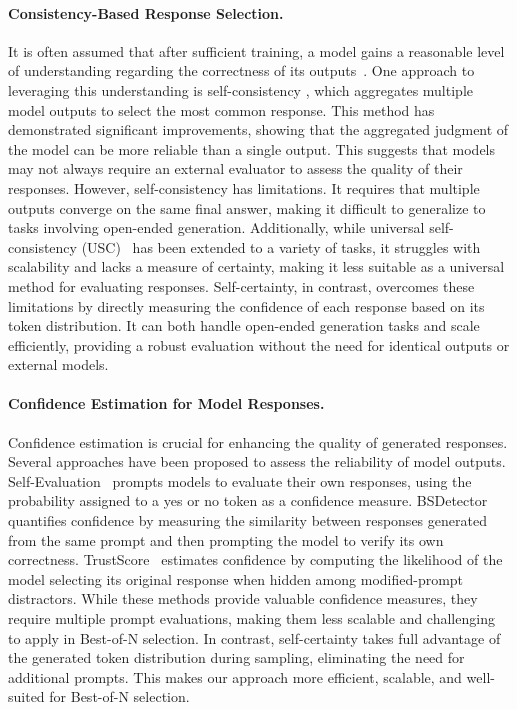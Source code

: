 \paragraph{Consistency-Based Response Selection.}
It is often assumed that after sufficient training, a model gains a reasonable level of understanding regarding the correctness of its outputs~\citep{liang2024internal}. One approach to leveraging this understanding is self-consistency \cite{wang2022self}, which aggregates multiple model outputs to select the most common response. This method has demonstrated significant improvements, showing that the aggregated judgment of the model can be more reliable than a single output. This suggests that models may not always require an external evaluator to assess the quality of their responses. However, self-consistency has limitations. It requires that multiple outputs converge on the same final answer, making it difficult to generalize to tasks involving open-ended generation. Additionally, while universal self-consistency (USC)~\citep{chen2023universal} has been extended to a variety of tasks, it struggles with scalability and lacks a measure of certainty, making it less suitable as a universal method for evaluating responses.
Self-certainty, in contrast, overcomes these limitations by directly measuring the confidence of each response based on its token distribution. It can both handle open-ended generation tasks and scale efficiently, providing a robust evaluation without the need for identical outputs or external models.

\paragraph{Confidence Estimation for Model Responses.}
Confidence estimation is crucial for enhancing the quality of generated responses. Several approaches have been proposed to assess the reliability of model outputs. Self-Evaluation~\citep{ren2023self} prompts models to evaluate their own responses, using the probability assigned to a yes or no token as a confidence measure. BSDetector~\citep{chen2024quantifying} quantifies confidence by measuring the similarity between responses generated from the same prompt and then prompting the model to verify its own correctness. TrustScore~\citep{zheng2024trustscore} estimates confidence by computing the likelihood of the model selecting its original response when hidden among modified-prompt distractors. While these methods provide valuable confidence measures, they require multiple prompt evaluations, making them less scalable and challenging to apply in Best-of-N selection. In contrast, self-certainty takes full advantage of the generated token distribution during sampling, eliminating the need for additional prompts. This makes our approach more efficient, scalable, and well-suited for Best-of-N selection.